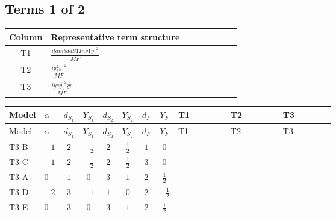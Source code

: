 \documentclass[8pt]{article}
\begin{document}
\begin{landscape}
\subsection*{Terms 1 of 2}
\begin{center}
\begin{tabular}{@{}c >{\raggedright\arraybackslash}p{0.82\linewidth}@{}}
\toprule
Column & Representative term structure \\
\midrule
T1 & \(\displaystyle \frac{i lambdaS1Inv1 \overline{y_{1}}^{2}}{MF}\) \\
\midrule
T2 & \(\displaystyle \frac{i g_{2}^{2} \overline{y_{1}}^{2}}{MF}\) \\
\midrule
T3 & \(\displaystyle \frac{i ye \overline{y_{1}}^{2} \overline{ye}}{MF}\) \\
\midrule
\bottomrule
\end{tabular}
\end{center}
\smallskip
\tiny
\begin{longtable}{@{}llcccccc >{\raggedright\arraybackslash}p{0.21\linewidth} >{\raggedright\arraybackslash}p{0.21\linewidth} >{\raggedright\arraybackslash}p{0.21\linewidth}@{}}
\toprule
Model & $\alpha$ & $d_{S_1}$ & $Y_{S_1}$ & $d_{S_2}$ & $Y_{S_2}$ & $d_F$ & $Y_F$ & T1 & T2 & T3 \\
\midrule
\endfirsthead
\toprule
Model & $\alpha$ & $d_{S_1}$ & $Y_{S_1}$ & $d_{S_2}$ & $Y_{S_2}$ & $d_F$ & $Y_F$ & T1 & T2 & T3 \\
\midrule
\endhead
T3-B & $-1$ & $2$ & $-\frac{1}{2}$ & $2$ & $\frac{1}{2}$ & $1$ & $0$ & \scriptsize\adjustbox{max width=\linewidth}{$\begin{gathered} \frac{i lambdaS1Inv1 \overline{y_{1}}^{2}}{4 MF}\end{gathered}$} & \scriptsize\adjustbox{max width=\linewidth}{$\begin{gathered} \frac{3 i g_{2}^{2} \overline{y_{1}}^{2}}{8 MF}\end{gathered}$} & \scriptsize\adjustbox{max width=\linewidth}{$\begin{gathered} - \frac{i ye \overline{y_{1}}^{2} \overline{ye}}{8 MF}\end{gathered}$} \\
\midrule
T3-C & $-1$ & $2$ & $-\frac{1}{2}$ & $2$ & $\frac{1}{2}$ & $3$ & $0$ & --- & --- & --- \\
\midrule
T3-A & $0$ & $1$ & $0$ & $3$ & $1$ & $2$ & $\frac{1}{2}$ & --- & --- & --- \\
\midrule
T3-D & $-2$ & $3$ & $-1$ & $1$ & $0$ & $2$ & $-\frac{1}{2}$ & --- & --- & --- \\
\midrule
T3-E & $0$ & $3$ & $0$ & $3$ & $1$ & $2$ & $\frac{1}{2}$ & --- & --- & --- \\
\midrule
\bottomrule
\end{longtable}
\clearpage

\end{landscape}
\end{document}
